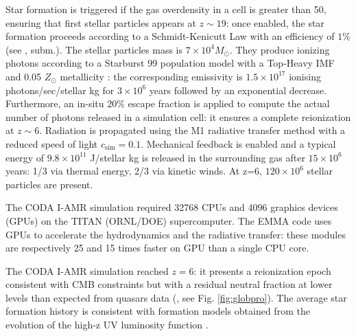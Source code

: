 \documentclass[twocolumn]{aastex61}
\newcommand{\dom}[1]{{#1}}
\begin{document}
Star formation is triggered if the gas overdensity in a cell is greater than 50, ensuring that first stellar particles appears at $z\sim 19$: once enabled, the star formation proceeds according to a Schmidt-Kenicutt Law with an efficiency of $1\%$ (see \citet{RAS06},\citet{DEP17} subm.). The stellar particles mass is  $7\times 10^4 M_\odot$. They produce ionizing photons according to a Starburst 99 population model \citep{LEI99} with a Top-Heavy IMF and 0.05 $Z_\odot$ metallicity : the corresponding emissivity is $1.5\times 10^{17}$ ionising photons/sec/stellar kg for $3\times 10^6$ years followed by an exponential decrease. Furthermore, an in-situ $20\%$ escape fraction is applied to compute the actual number of photons released in a simulation cell: it ensures a complete reionization at $z\sim 6$.  \dom{Radiation is propagated using the M1 radiative transfer method with a reduced speed of light $c_\mathrm{sim}=0.1$}. Mechanical feedback is enabled and a typical energy of $9.8\times 10^{11}$ J/stellar kg is released in the surrounding gas after $15\times 10^6$ years: 1/3 via thermal energy, 2/3 via kinetic winds. At z=6, $120\times 10^6$ stellar particles are present.

The CODA I-AMR simulation required 32768 CPUs and 4096 graphics devices (GPUs) on the TITAN (ORNL/DOE) supercomputer. The EMMA code uses GPUs to accelerate the hydrodynamics and the radiative transfer: these modules are respectively 25 and 15 times faster on GPU than a single CPU core. %


The CODA I-AMR simulation reached $z=6$: it presents a reionization epoch consistent with CMB constraints \citep{PLA15} but with a residual neutral fraction at lower levels than expected from quasars data (\citet{FAN6}, see Fig. \ref{fig:globpro}). The average star formation history is consistent with formation models obtained from the evolution of the high-z UV luminosity function \citep{BOU14,FIN15}.  
\end{document}

